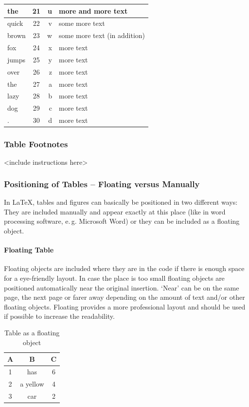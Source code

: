 \documentclass{pharmrep}
\newcommand{\eg}{e.\,g.\xspace}
\begin{document}
\begin{tabularx}{\textwidth}{lcrX}
   the   & 21    & u     & more and more text \\ \midrule
   quick & 22    & v     & some more text \\ \midrule
   brown & 23    & w     & some more text (in addition) \\ \midrule
   fox   & 24    & x     & more text \\ \midrule
   jumps & 25    & y     & more text \\ \midrule
   over  & 26    & z     & more text \\ \midrule
   the   & 27    & a     & more text \\ \midrule
   lazy  & 28    & b     & more text \\ \midrule
   dog   & 29    & c     & more text \\ \midrule
   .     & 30    & d     & more text \\ \midrule
\end{tabularx}

\portraitformat

\subsubsection{Table Footnotes}
<include instructions here>

\subsubsection{Positioning of Tables -- Floating versus Manually}\label{subsubsec:TableFloating}
In \LaTeX, tables and figures can basically be positioned in two different ways: They are included manually
and appear exactly at this place (like in word processing software, \eg Microsoft Word) or they can be
included as a floating object.

\paragraph{Floating Table}
Floating objects are included where they are in the code if there is enough space for a eye-friendly
layout. In case the place is too small floating objects are positioned automatically near the original
insertion. `Near' can be on the same page, the next page or farer away depending on the amount of text
and/or other floating objects. Floating provides a more professional layout and should be used if
possible
to increase the readability.
\begin{table}[hbpt]
   \begin{tabular}{ccc}\toprule
      A & B & C \\\midrule
      1 & has & 6 \\
      2 & a yellow & 4 \\
      3 & car & 2 \\\bottomrule
   \end{tabular}
   \caption[short caption table]{Table as a floating object}\label{tab:tableFloatingObject}
\end{table}
\end{document}
